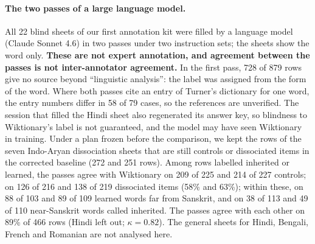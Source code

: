 \documentclass[11pt]{article}
\begin{document}
\paragraph{The two passes of a large language model.} All 22 blind sheets of our first annotation kit were filled by a language model (Claude Sonnet 4.6) in two passes under two instruction sets; the sheets show the word only. \textbf{These are not expert annotation, and agreement between the passes is not inter-annotator agreement.} In the first pass, 728 of 879 rows give no source beyond ``linguistic analysis'': the label was assigned from the form of the word. Where both passes cite an entry of Turner's dictionary for one word, the entry numbers differ in 58 of 79 cases, so the references are unverified. The session that filled the Hindi sheet also regenerated its answer key, so blindness to Wiktionary's label is not guaranteed, and the model may have seen Wiktionary in training. Under a plan frozen before the comparison, we kept the rows of the seven Indo-Aryan dissociation sheets that are still controls or dissociated items in the corrected baseline (272 and 251 rows). Among rows labelled inherited or learned, the passes agree with Wiktionary on 209 of 225 and 214 of 227 controls; on 126 of 216 and 138 of 219 dissociated items (58\% and 63\%); within these, on 88 of 103 and 89 of 109 learned words far from Sanskrit, and on 38 of 113 and 49 of 110 near-Sanskrit words called inherited. The passes agree with each other on 89\% of 466 rows (Hindi left out; $\kappa=0.82$). The general sheets for Hindi, Bengali, French and Romanian are not analysed here.
\end{document}
